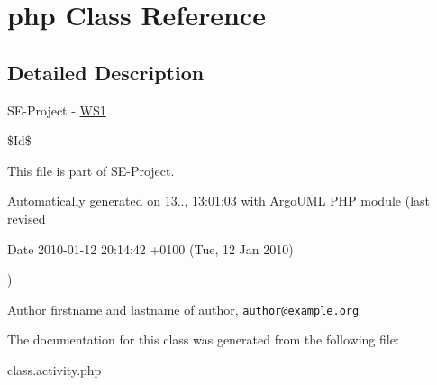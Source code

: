 \hypertarget{class_1_1activity_1_1php}{\section{php Class Reference}
\label{class_1_1activity_1_1php}
}


\subsection{Detailed Description}
S\+E-\/\+Project -\/ \hyperlink{namespace_w_s1}{W\+S1}

\$\+Id\$

This file is part of S\+E-\/\+Project.

Automatically generated on 13.., 13\+:01\+:03 with Argo\+U\+M\+L P\+H\+P module (last revised \begin{DoxyParagraph}{Date}
2010-\/01-\/12 20\+:14\+:42 +0100 (Tue, 12 Jan 2010) 
\end{DoxyParagraph}
)

\begin{DoxyAuthor}{Author}
firstname and lastname of author, \href{mailto:author@example.org}{\tt author@example.\+org} 
\end{DoxyAuthor}


The documentation for this class was generated from the following file\+:\begin{DoxyCompactItemize}
\item 
class.\+activity.\+php\end{DoxyCompactItemize}
